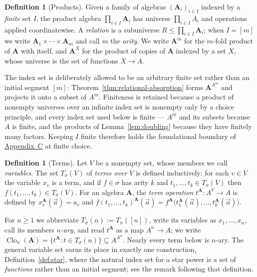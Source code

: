 \documentclass[11pt]{article}
\theoremstyle{mainplain}
\theoremstyle{mainroman}
\theoremstyle{definition}
\newtheorem{definition}[theorem]{Definition}
\numberwithin{equation}{section}
\DeclareMathOperator{\Clo}{Clo}
\newcommand{\bA}{\mathbf A}
\newcommand{\Tm}{T_\sigma}
\begin{document}
\begin{definition}[Products]\label{def:product}
Given a family of algebras $(\bA_i)_{i\in I}$ indexed by a \emph{finite} set
$I$, the product algebra $\prod_{i\in I}\bA_i$ has universe
$\prod_{i\in I}A_i$ and operations
applied coordinatewise. A \emph{relation} is a subuniverse
$R\le\prod_{i\in I}\bA_i$; when $I=[m]$ we write
$\bA_1\times\cdots\times\bA_m$ and call $m$ the \emph{arity}. We write $\bA^m$
for the $m$-fold product of $\bA$ with itself, and $\bA^{X}$ for the product of
copies of $\bA$ indexed by a set $X$, whose universe is the set of functions
$X\to A$.

The index set is deliberately allowed to be an arbitrary finite set rather than
an initial segment $[m]$: Theorem~\ref{thm:relational-absorption} forms
$\bA^{A^m}$ and projects it onto a subset of $A^m$. Finiteness is retained
because a product of nonempty universes over an infinite index set is nonempty
only by a choice principle, and every index set used below is finite ---
$A^{m}$ and its subsets because $A$ is finite, and the products of
Lemma~\ref{lem:doubling} because they have finitely many factors. Keeping $I$
finite therefore holds the foundational boundary of
\hyperref[app:background]{Appendix~C} at finite choice.
\end{definition}

\begin{definition}[Terms]\label{def:term}
Let $V$ be a nonempty set, whose members we call \emph{variables}. The set
$\Tm(V)$ of \emph{terms over $V$} is defined inductively: for each $v\in V$ the
variable $x_v$ is a term, and if $f\in\sigma$ has arity $k$ and
$t_1,\dots,t_k\in\Tm(V)$ then $f(t_1,\dots,t_k)\in\Tm(V)$. For an algebra
$\bA$, the \emph{term operation} $t^{\bA}:A^{V}\to A$ is defined by
$x_v^{\bA}(\vec a)=a_v$ and
$f(t_1,\dots,t_k)^{\bA}(\vec a)=f^{\bA}\bigl(t_1^{\bA}(\vec a),\dots,t_k^{\bA}(\vec a)\bigr)$.

For $n\ge1$ we abbreviate $\Tm(n):=\Tm([n])$, write its variables as
$x_1,\dots,x_n$, call its members \emph{$n$-ary}, and read $t^{\bA}$ as a map
$A^n\to A$; we write $\Clo_n(\bA)=\{t^{\bA}:t\in\Tm(n)\}\subseteq A^{A^n}$.
Nearly every term below is $n$-ary. The general variable set earns its place in
exactly one construction, Definition~\ref{def:star}, where the natural index set
for a star power is a set of \emph{functions} rather than an initial segment;
see the remark following that definition.
\end{definition}
\end{document}
